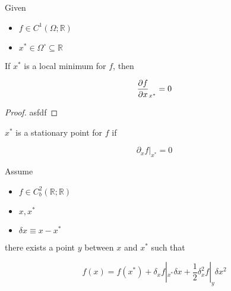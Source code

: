 \begin{theorem}
    
    Given
    \begin{itemize}
        \item $f\in C^1(\Omega;\mathbb{R})$
        \item $x^* \in \Omega^\circ \subseteq \mathbb{R}$
    \end{itemize}

    If $x^*$ is a local minimum for $f$, then
    
    \begin{equation*}
        \pdv{f}{x}_{x^*} = 0
    \end{equation*}

    \begin{proof}
        asfdf
    \end{proof}
\end{theorem}

\begin{definition}
    
    $x^*$ is a stationary point for $f$ if

    \begin{equation}
        \partial_xf|_{x^*} = 0
    \end{equation}
\end{definition}

\begin{theorem}
    
    Assume
    \begin{itemize}
        \item $f\in C^2_b(\mathbb{R};\mathbb{R})$
        \item $x,x^*$
        \item $\delta x\equiv x-x^*$
    \end{itemize}
    
    there exists a point $y$ between $x$ and $x^*$ such that

    \begin{equation}
        f(x) = f(x^*) + \delta_x f|_{x^*}\delta x + \frac{1}{2}\delta^2_xf|_y\delta x^2
    \end{equation}

\end{theorem}

